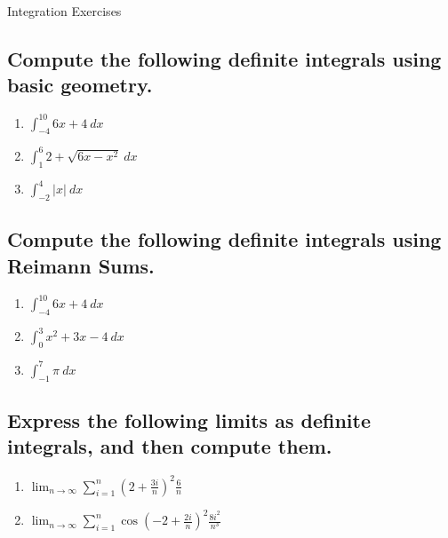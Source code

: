 \documentclass{article}
\begin{document}
\begin{center}
\begin{Huge}Integration Exercises\end{Huge}
\end{center}


\subsection{Compute the following definite integrals using basic geometry.}

\begin{multicols}{3}
\begin{enumerate}
\item $\displaystyle \int_{-4}^{10}6x+4\ dx$
\item $\displaystyle \int_1^6 2+\sqrt{6x-x^{2}}\ dx$
\item $\displaystyle \int_{-2}^{4} |x|\ dx$
\end{enumerate}
\end{multicols}

\subsection{Compute the following definite integrals using Reimann Sums.}

\begin{multicols}{3}
\begin{enumerate}
\item $\displaystyle \int_{-4}^{10}6x+4\ dx$
\item $\displaystyle \int_0^3 x^2+3x-4\ dx$
\item $\displaystyle \int_{-1}^{7} \pi\ dx$
\end{enumerate}
\end{multicols}

\subsection{Express the following limits as definite integrals, and then compute them.}

\begin{multicols}{2}
\begin{enumerate}
\item $\displaystyle \lim_{n\to\infty}\sum_{i=1}^{n} \left(2+\frac{3i}{n}\right)^2\frac{6}{n}$
\item $\displaystyle \lim_{n\to\infty}\sum_{i=1}^{n} \cos\left(-2+\frac{2i}{n}\right)^2\frac{8i^2}{n^3}$
\end{enumerate}
\end{multicols}
\end{document}
